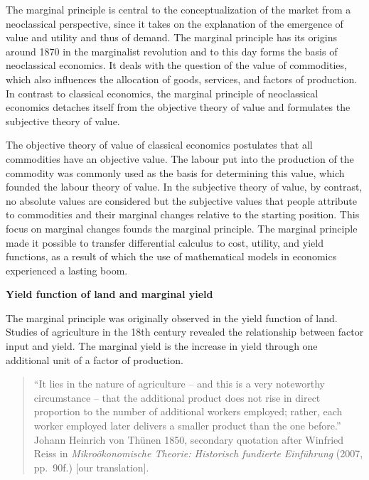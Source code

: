 \documentclass[
  british,
  a4paper,
  DIV=11,
  numbers=noendperiod,
  oneside,
  openany]{scrreprt}
\begin{document}
\begin{tcolorbox}[enhanced jigsaw, arc=.35mm, bottomrule=.15mm, bottomtitle=1mm, breakable, colback=white, colbacktitle=quarto-callout-tip-color!10!white, colframe=quarto-callout-tip-color-frame, coltitle=black, left=2mm, leftrule=.75mm, opacityback=0, opacitybacktitle=0.6, rightrule=.15mm, title={Excursus: The marginal principle -- marginal utility and marginal cost}, titlerule=0mm, toprule=.15mm, toptitle=1mm]

The marginal principle is central to the conceptualization of the market
from a neoclassical perspective, since it takes on the explanation of
the emergence of value and utility and thus of demand. The marginal
principle has its origins around 1870 in the marginalist revolution and
to this day forms the basis of neoclassical economics. It deals with the
question of the value of commodities, which also influences the
allocation of goods, services, and factors of production. In contrast to
classical economics, the marginal principle of neoclassical economics
detaches itself from the objective theory of value and formulates the
subjective theory of value.

The objective theory of value of classical economics postulates that all
commodities have an objective value. The labour put into the production
of the commodity was commonly used as the basis for determining this
value, which founded the labour theory of value. In the subjective
theory of value, by contrast, no absolute values are considered but the
subjective values that people attribute to commodities and their
marginal changes relative to the starting position. This focus on
marginal changes founds the marginal principle. The marginal principle
made it possible to transfer differential calculus to cost, utility, and
yield functions, as a result of which the use of mathematical models in
economics experienced a lasting boom.

\textbf{Yield function of land and marginal yield}

The marginal principle was originally observed in the yield function of
land. Studies of agriculture in the 18th century revealed the
relationship between factor input and yield. The marginal yield is the
increase in yield through one additional unit of a factor of production.

\begin{quote}
``It lies in the nature of agriculture -- and this is a very noteworthy
circumstance -- that the additional product does not rise in direct
proportion to the number of additional workers employed; rather, each
worker employed later delivers a smaller product than the one before.''
Johann Heinrich von Thünen 1850, secondary quotation after Winfried
Reiss in \emph{Mikroökonomische Theorie: Historisch fundierte
Einführung} (2007, pp.~90f.) {[}our translation{]}.
\end{quote}


\end{tcolorbox}
\end{document}
